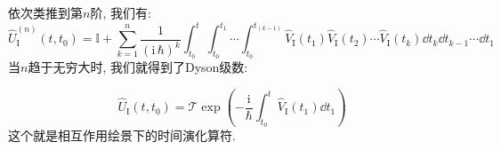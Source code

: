 依次类推到第$n$阶, 我们有:
\begin{equation}
  \hat{U}_{\text{I}}^{(n)}(t,t_0) = \mathbb{I} + \sum_{k=1}^{n} \frac{1}{(\mathrm{i}\,\hbar)^k} \int_{t_0}^{t} \int_{t_0}^{t_1} \cdots \int_{t_0}^{t_{(k-1)}} \hat{V}_{\text{I}}(t_1) \hat{V}_{\text{I}}(t_2) \cdots \hat{V}_{\text{I}}(t_k) \dd{t_k} \dd{t_{k-1}} \cdots \dd{t_1}
\end{equation}
当$n$趋于无穷大时, 我们就得到了Dyson级数:
\begin{fancybox}
\begin{equation}
  \hat{U}_{\text{I}}(t,t_0) = \mathcal{T} \exp\left( -\frac{\mathrm{i}}{\hbar} \int_{t_0}^{t} \hat{V}_{\text{I}}(t_1) \dd{t_1} \right)
\end{equation}
这个就是相互作用绘景下的时间演化算符.
\end{fancybox}


